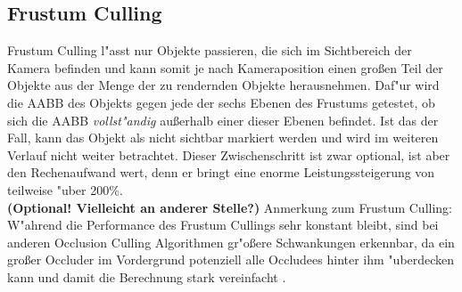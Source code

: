 \documentclass[journal]{vgtc}
\begin{document}
\subsection{Frustum Culling}
Frustum Culling l"asst nur Objekte passieren, die sich im Sichtbereich der Kamera befinden und kann somit je nach Kameraposition einen gro{\ss}en Teil der Objekte aus der Menge der zu rendernden Objekte herausnehmen. Daf"ur wird die AABB des Objekts gegen jede der sechs Ebenen des Frustums getestet, ob sich die AABB \textit{vollst"andig} au{\ss}erhalb einer dieser Ebenen befindet. Ist das der Fall, kann das Objekt als nicht sichtbar markiert werden und wird im weiteren Verlauf nicht weiter betrachtet. Dieser Zwischenschritt ist zwar optional, ist aber den Rechenaufwand wert, denn er bringt eine enorme Leistungssteigerung von teilweise "uber 200\%.\\
\textbf{(Optional! Vielleicht an anderer Stelle?)} Anmerkung zum Frustum Culling: W"ahrend die Performance des Frustum Cullings sehr konstant bleibt, sind bei anderen Occlusion Culling Algorithmen gr"o\ss{}ere Schwankungen erkennbar, da ein gro\ss{}er Occluder im Vordergrund potenziell alle Occludees hinter ihm "uberdecken kann und damit die Berechnung stark vereinfacht \cite{MSOC}.\\
\end{document}
